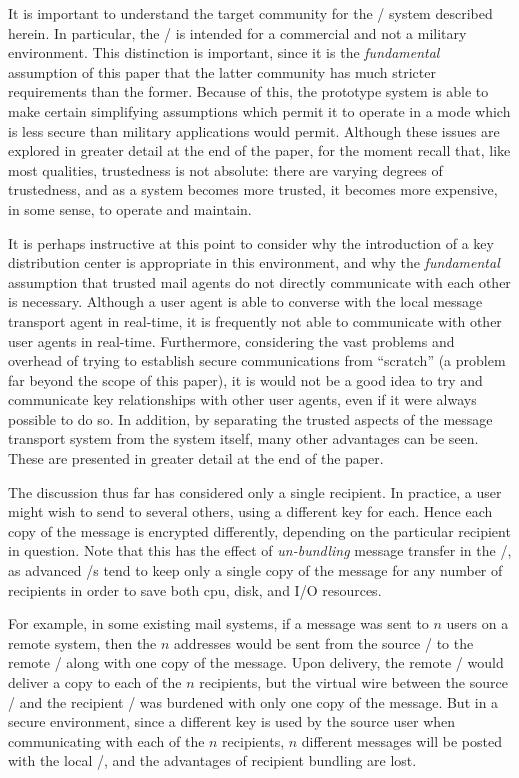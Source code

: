 It is important to understand the target community for the \trustedmail/ system
described herein.
In particular,
the \TMA/ is intended for a commercial and not a military environment.
This distinction is important,
since it is the {\it fundamental} assumption of this paper that
the latter community has much stricter requirements than the former.
Because of this,
the prototype system is able to make certain simplifying assumptions which
permit it to operate in a mode which is less secure than military
applications would permit.
Although these issues are explored in greater detail at the end of the paper,
for the moment recall that, like most qualities, trustedness is not absolute:
there are varying degrees of trustedness,
and as a system becomes more trusted,
it becomes more expensive, in some sense, to operate and maintain.

It is perhaps instructive at this point to consider why the introduction of a
key distribution center is appropriate in this environment,
and why the {\it fundamental} assumption that trusted mail agents do not
directly communicate with each other is necessary.
Although a user agent is able to converse with the local message transport
agent in real-time,
it is frequently not able to communicate with other user agents in real-time.
Furthermore,
considering the vast problems and overhead
of trying to establish secure communications from ``scratch''
(a problem far beyond the scope of this paper),
it is would not be a good idea to try and communicate key relationships with
other user agents,
even if it were always possible to do so.
In addition,
by separating the trusted aspects of the message transport system from the
system itself,
many other advantages can be seen.
These are presented in greater detail at the end of the paper.

The discussion thus far has considered only a single recipient.
In practice, a user might wish to send to several others,
using a different key for each.
Hence each copy of the message is encrypted differently,
depending on the particular recipient in question.
Note that this has the effect of {\it un-bundling} message transfer in the
\MTS/,
as advanced \MTA/s tend to keep only a single copy of the message for any
number of recipients in order to save both cpu, disk, and I/O resources.

For example,
in some existing mail systems,
if a message was sent to $n$ users on a remote system,
then the $n$ addresses would be sent from the source \MTA/ to the remote \MTA/
along with one copy of the message.
Upon delivery,
the remote \MTA/ would deliver a copy to each of the $n$ recipients,
but the virtual wire between the source \MTA/ and the recipient \MTA/ was
burdened with only one copy of the message.
But in a secure environment,
since a different key is used by the source user when communicating with each
of the $n$ recipients,
$n$ different messages will be posted with the local \MTA/,
and the advantages of recipient bundling are lost.

